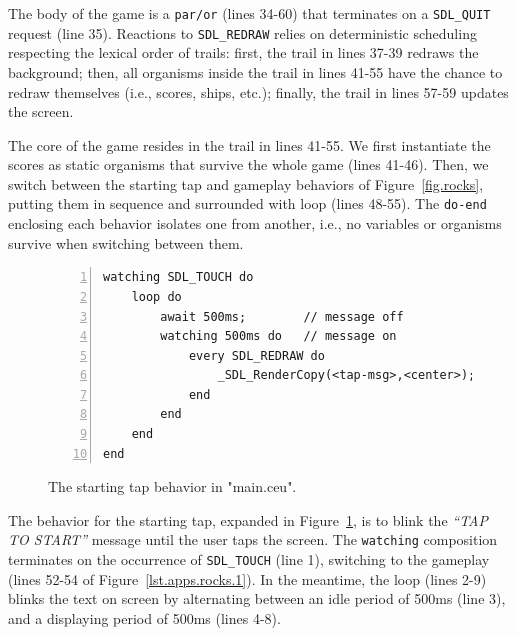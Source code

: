 \documentclass{sigplanconf}
\newcommand{\code}[1] {{\small{\texttt{#1}}}}
\newcommand{\1}{\;}
\newcommand{\2}{\;\;}
\newcommand{\3}{\;\;\;}
\newcommand{\5}{\;\;\;\;\;}
\begin{document}
The body of the game is a \code{par/or} (lines 34-60) that terminates on a
\code{SDL\_QUIT} request (line 35).
%
Reactions to \code{SDL\_REDRAW} relies on deterministic scheduling respecting 
the lexical order of trails: first, the trail in lines 37-39 redraws the 
background; then, all organisms inside the trail in lines 41-55 have the chance 
to redraw themselves (i.e., scores, ships, etc.); finally, the trail in lines 
57-59 updates the screen.

The core of the game resides in the trail in lines 41-55.
We first instantiate the scores as static organisms that survive the whole game 
(lines 41-46).
Then, we switch between the starting tap and gameplay behaviors of 
Figure~\ref{fig.rocks}, putting them in sequence and surrounded with loop 
(lines 48-55).
The \code{do-end} enclosing each behavior isolates one from another, i.e., no 
variables or organisms survive when switching between them.

\begin{figure}%
\begin{lstlisting}[numbers=left,xleftmargin=3em]
watching SDL_TOUCH do
    loop do
        await 500ms;        // message off
        watching 500ms do   // message on
            every SDL_REDRAW do
                _SDL_RenderCopy(<tap-msg>,<center>);
            end
        end
    end
end
\end{lstlisting}
\caption{ The starting tap behavior in "main.ceu".
\label{lst.apps.rocks.2}
}
\end{figure}

The behavior for the starting tap, expanded in Figure~\ref{lst.apps.rocks.2}, 
is to blink the \emph{``TAP TO START''} message until the user taps the screen.
The \code{watching} composition terminates on the occurrence of 
\code{SDL\_TOUCH} (line 1), switching to the gameplay (lines 52-54 of 
Figure~\ref{lst.apps.rocks.1}).
In the meantime, the loop (lines 2-9) blinks the text on screen by alternating 
between an idle period of 500ms (line 3), and a displaying period of 500ms 
(lines 4-8).
\end{document}
